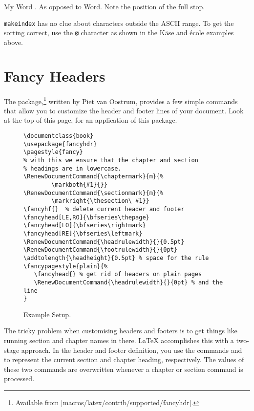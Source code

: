 \begin{example}
My Word . As opposed
to Word. Note the
position of the full stop.
\end{example}

\texttt{makeindex} has no clue about characters outside the ASCII range. To
get the sorting correct, use the \verb|@| character as shown in the K\"ase
and \'ecole examples above.

\section{Fancy Headers}
\label{sec:fancy}

The  package,\footnote{Available from
  \CTAN|macros/latex/contrib/supported/fancyhdr|.} written by
Piet van Oostrum, provides a few simple commands that allow you to
customize the header and footer lines of your document.  Look
at the top of this page, for an application of this
package.

\begin{figure}[!htbp]
\begin{lined}{\textwidth}
\begin{verbatim}
\documentclass{book}
\usepackage{fancyhdr}
\pagestyle{fancy}
% with this we ensure that the chapter and section
% headings are in lowercase.
\RenewDocumentCommand{\chaptermark}{m}{%
        \markboth{#1}{}}
\RenewDocumentCommand{\sectionmark}{m}{%
        \markright{\thesection\ #1}}
\fancyhf{}  % delete current header and footer
\fancyhead[LE,RO]{\bfseries\thepage}
\fancyhead[LO]{\bfseries\rightmark}
\fancyhead[RE]{\bfseries\leftmark}
\RenewDocumentCommand{\headrulewidth}{}{0.5pt}
\RenewDocumentCommand{\footrulewidth}{}{0pt}
\addtolength{\headheight}{0.5pt} % space for the rule
\fancypagestyle{plain}{%
   \fancyhead{} % get rid of headers on plain pages
   \RenewDocumentCommand{\headrulewidth}{}{0pt} % and the line
}
\end{verbatim}
\end{lined}
\caption{Example  Setup.} \label{fancyhdr}
\end{figure}

The tricky problem when customising headers and footers is to get
things like running section and chapter names in there. \LaTeX{}
accomplishes this with a two-stage approach. In the header and footer
definition, you use the commands  and  to
represent the current section and chapter heading, respectively.
The values of these two commands are overwritten whenever a chapter or
section command is processed.


